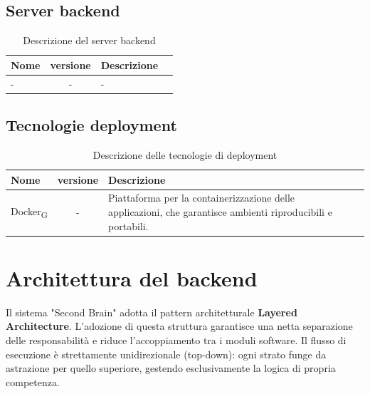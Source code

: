 \documentclass[11pt,a4paper]{article}
\newcommand{\gls}[1]{#1\textsubscript{G}}
\begin{document}
\subsection{Server backend}
    \begin{table}[H]
        \centering
        \begin{tabular}{|l|c|>{\raggedright\arraybackslash}p{}|p{}|}
            \hline
            \textbf{Nome} & \textbf{versione} & \textbf{Descrizione} \\
            \hline
            - & - & - \\
            \hline
        \end{tabular}
        \caption{Descrizione del server backend}
        \label{tab:server_backend}
    \end{table}
\subsection{Tecnologie deployment}
    \begin{table}[H]
        \centering
        \begin{tabular}{|l|c|>{\raggedright\arraybackslash}p{}|p{}|}
            \hline
            \textbf{Nome} & \textbf{versione} & \textbf{Descrizione} \\
            \hline
            \gls{Docker} & - & Piattaforma per la containerizzazione delle applicazioni, che garantisce ambienti riproducibili e portabili. \\
            \hline
        \end{tabular}
        \caption{Descrizione delle tecnologie di deployment}
        \label{tab:tecnologie_deployment}
    \end{table}

\newpage

\section{Architettura del backend}
Il sistema "Second Brain" adotta il pattern architetturale \textbf{Layered Architecture}. L'adozione di questa struttura garantisce una netta separazione delle responsabilità e riduce l'accoppiamento tra i moduli software. Il flusso di esecuzione è strettamente unidirezionale (top-down): ogni strato funge da astrazione per quello superiore, gestendo esclusivamente la logica di propria competenza.
\end{document}
